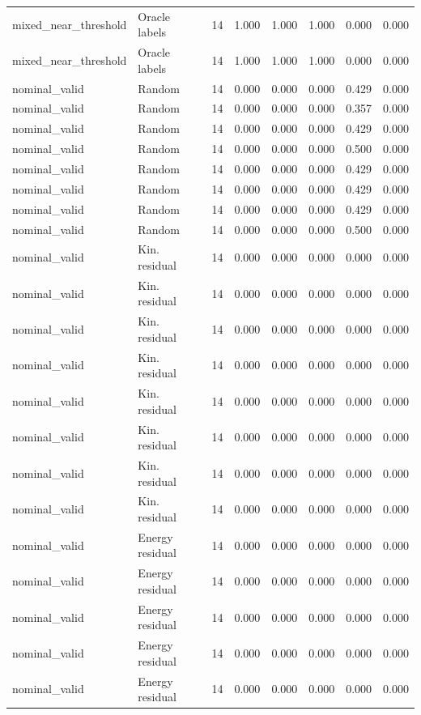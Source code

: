 {\begin{longtable}{llrrrrrr}
mixed\_near\_threshold & Oracle labels & 14 & 1.000 & 1.000 & 1.000 & 0.000 & 0.000 \\
mixed\_near\_threshold & Oracle labels & 14 & 1.000 & 1.000 & 1.000 & 0.000 & 0.000 \\
nominal\_valid & Random & 14 & 0.000 & 0.000 & 0.000 & 0.429 & 0.000 \\
nominal\_valid & Random & 14 & 0.000 & 0.000 & 0.000 & 0.357 & 0.000 \\
nominal\_valid & Random & 14 & 0.000 & 0.000 & 0.000 & 0.429 & 0.000 \\
nominal\_valid & Random & 14 & 0.000 & 0.000 & 0.000 & 0.500 & 0.000 \\
nominal\_valid & Random & 14 & 0.000 & 0.000 & 0.000 & 0.429 & 0.000 \\
nominal\_valid & Random & 14 & 0.000 & 0.000 & 0.000 & 0.429 & 0.000 \\
nominal\_valid & Random & 14 & 0.000 & 0.000 & 0.000 & 0.429 & 0.000 \\
nominal\_valid & Random & 14 & 0.000 & 0.000 & 0.000 & 0.500 & 0.000 \\
nominal\_valid & Kin. residual & 14 & 0.000 & 0.000 & 0.000 & 0.000 & 0.000 \\
nominal\_valid & Kin. residual & 14 & 0.000 & 0.000 & 0.000 & 0.000 & 0.000 \\
nominal\_valid & Kin. residual & 14 & 0.000 & 0.000 & 0.000 & 0.000 & 0.000 \\
nominal\_valid & Kin. residual & 14 & 0.000 & 0.000 & 0.000 & 0.000 & 0.000 \\
nominal\_valid & Kin. residual & 14 & 0.000 & 0.000 & 0.000 & 0.000 & 0.000 \\
nominal\_valid & Kin. residual & 14 & 0.000 & 0.000 & 0.000 & 0.000 & 0.000 \\
nominal\_valid & Kin. residual & 14 & 0.000 & 0.000 & 0.000 & 0.000 & 0.000 \\
nominal\_valid & Kin. residual & 14 & 0.000 & 0.000 & 0.000 & 0.000 & 0.000 \\
nominal\_valid & Energy residual & 14 & 0.000 & 0.000 & 0.000 & 0.000 & 0.000 \\
nominal\_valid & Energy residual & 14 & 0.000 & 0.000 & 0.000 & 0.000 & 0.000 \\
nominal\_valid & Energy residual & 14 & 0.000 & 0.000 & 0.000 & 0.000 & 0.000 \\
nominal\_valid & Energy residual & 14 & 0.000 & 0.000 & 0.000 & 0.000 & 0.000 \\
nominal\_valid & Energy residual & 14 & 0.000 & 0.000 & 0.000 & 0.000 & 0.000 \\

\end{longtable}}
